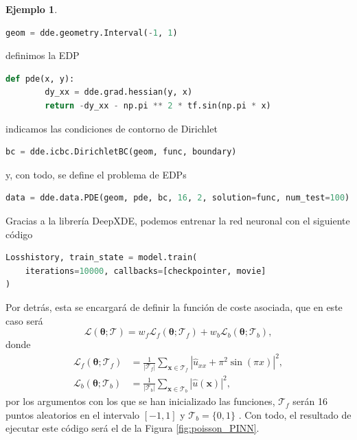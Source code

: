 \documentclass[a4paper,11pt,spanish, twoside, leqno]{tfg-uam}
\theoremstyle{definition}
\newtheorem{exmp}[teor]{Ejemplo}
\begin{document}
\begin{mdframed}
\begin{exmp}
\begin{lstlisting}[language=Python]
    geom = dde.geometry.Interval(-1, 1)
\end{lstlisting}
        definimos la EDP
\begin{lstlisting}[language=Python]
    def pde(x, y):
        dy_xx = dde.grad.hessian(y, x)
        return -dy_xx - np.pi ** 2 * tf.sin(np.pi * x)
\end{lstlisting}
    indicamos las condiciones de contorno de Dirichlet
\begin{lstlisting}[language=Python]
    bc = dde.icbc.DirichletBC(geom, func, boundary)
\end{lstlisting}
y, con todo, se define el problema de EDPs
\begin{lstlisting}[language=Python]
   data = dde.data.PDE(geom, pde, bc, 16, 2, solution=func, num_test=100)
\end{lstlisting}
    Gracias a la librería DeepXDE, podemos entrenar la red neuronal con el siguiente código
\begin{lstlisting}[language=Python]
Losshistory, train_state = model.train(
    iterations=10000, callbacks=[checkpointer, movie]
)
\end{lstlisting}
    Por detrás, esta se encargará de definir la función de coste asociada, que en este caso será
    \begin{equation*} 
        \mathcal{L}(\boldsymbol{\theta}; \mathcal{T}) = w_f \mathcal{L}_f(\boldsymbol{\theta}; \mathcal{T}_f) + w_b \mathcal{L}_b(\boldsymbol{\theta}; \mathcal{T}_b),
    \end{equation*}
    donde
    \begin{align*}
        \mathcal{L}_f(\boldsymbol{\theta}; \mathcal{T}_f) &= \frac{1}{|\mathcal{T}_f|} \sum_{\mathbf{x} \in \mathcal{T}_f} | \hat{u}_{xx} +\pi^2 \sin(\pi x)|^2, \\ 
        \mathcal{L}_b(\boldsymbol{\theta}; \mathcal{T}_b) &= \frac{1}{|\mathcal{T}_b|} \sum_{\mathbf{x} \in \mathcal{T}_b} | \hat{u} (\mathbf{x})|^2,
    \end{align*}
    por los argumentos con los que se han inicializado las funciones, $\mathcal{T}_f$ serán 16 puntos aleatorios en el intervalo $[-1,1]$ y $\mathcal{T}_b = \{0,1\}$ . Con todo, el resultado de ejecutar este código será el de la Figura \ref{fig:poisson_PINN}.


\end{exmp}
\end{mdframed}
\end{document}
